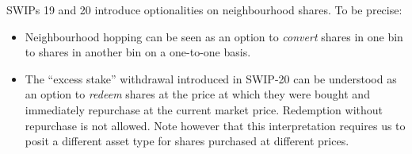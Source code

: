   SWIPs 19 and 20 introduce optionalities on neighbourhood shares. To be precise:
  \begin{itemize}
    \item Neighbourhood hopping can be seen as an option to \emph{convert} shares in one bin to shares in another bin on a one-to-one basis.
    \item The ``excess stake'' withdrawal introduced in SWIP-20 can be understood as an option to \emph{redeem} shares at the price at which they were bought and immediately repurchase at the current market price.
    Redemption without repurchase is not allowed.
    Note however that this interpretation requires us to posit a different asset type for shares purchased at different prices.
  \end{itemize}
\begin{comment}
\subsubsection*{Assumptions of the current model}

This month we were able to lift some of the assumptions of the model we studied in August, but quite a few remain:
\begin{itemize}
  \item Perfect information: all players know the strategies of the other players at all future steps. Perhaps a more realistic approach is to model the mechanism as a (dynamic) Bayes game of incomplete information.
  \item Stationarity: the (expected) revenue of the target neighbourhood remains constant. In reality, expected revenue is affected by network demand, the decisions of stakers via the price oracle, and the price of competing services.
  Similarly, operational costs depend on the costs of hardware and electricity.
  \item We considered all costs and rewards as BZZ denominated. But operational costs and the time preference discount rate $r$ are more easily modelled in terms of fiat currency.
  \item We didn't model any time delays between stake top-ups and reward weight updates.
  \item We didn't model the risk of being frozen or slashed due to liveness failures.
  \item We didn't incorporate changes to the gate function introduced in SWIP-20.
  \item We assumed the neighbourhood count remains constant.
\end{itemize}
\end{comment}